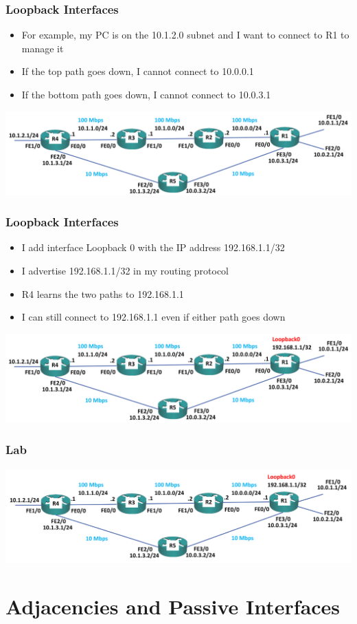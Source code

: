 \documentclass[pdflatex,compress,mathserif]{beamer}
\begin{document}
\begin{frame}
	\frametitle{Loopback Interfaces}
	\begin{itemize}
		\item For example, my PC is on the 10.1.2.0 subnet and I want to connect to R1
to manage it
		\item If the top path goes down, I cannot connect to 10.0.0.1
		\item If the bottom path goes down, I cannot connect to 10.0.3.1
	\end{itemize}
	\begin{center}
		\includegraphics[width=\linewidth]{img/img33}
	\end{center}
\end{frame}

\begin{frame}
	\frametitle{Loopback Interfaces}
	\begin{itemize}
		\item I add interface Loopback 0 with the IP address 192.168.1.1/32
		\item I advertise 192.168.1.1/32 in my routing protocol
		\item R4 learns the two paths to 192.168.1.1
		\item I can still connect to 192.168.1.1 even if either path goes down
	\end{itemize}
	\begin{center}
		\includegraphics[width=\linewidth]{img/img34}
	\end{center}
\end{frame}

\begin{frame}
	\frametitle{Lab}
	\begin{center}
		\includegraphics[width=\linewidth]{img/img35}
	\end{center}
\end{frame}

\section{Adjacencies and Passive Interfaces}
\end{document}
